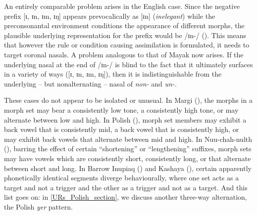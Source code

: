 An entirely comparable problem arises in the English case. Since the negative prefix [ɪ, ɪn, ɪm, ɪŋ] appears prevocalically as [ɪn] (\textit{inelegant})  while the preconsonantal environment conditions the appearance of different morphs, the plausible underlying representation for the prefix would be /ɪn-/ (\citealt{Allen:1978}). This means that however the rule or condition causing assimilation is formulated, it needs to target coronal nasals. A problem analogous to that of Mayak now arises. If the underlying nasal at the end of /ɪn-/ is blind to the fact that it ultimately surfaces in a variety of ways ([ɪ, ɪn, ɪm, ɪŋ]), then it is indistinguishable from the underlying -- but nonalternating -- nasal of \textit{non-} and \textit{un-}.


These cases do not appear to be isolated or unusual. In Margi (\citealt{Hoffmann:1963, Pulleyblank:1986, Archangeli+:2018routledge}), the morphs in a morph set may bear a consistently low tone, a consistently high tone, or may alternate between low and high. In Polish (\citealt{Bethin:1978, Sanders:2003}), morph set members may exhibit a back vowel that is consistently mid, a back vowel that is consistently high, or may exhibit back vowels that alternate between mid and high. In Nuu-chah-nulth (\citealt{Davidson:2002, Stonham:1990, Kim:2003, Archangeli+:2018Henry}), barring the effect of certain ``shortening'' or ``lengthening'' suffixes, morph sets may have vowels which are consistently short, consistently long, or that alternate between short and long. In Barrow Inupiaq (\citealt{Kaplan:1981, Archangeli+:1994}) and Kashaya (\citealt{Buckley:1994}), certain apparently phonetically identical segments diverge behaviourally, where one set acts as a target and not a trigger and the other as a trigger and not as a target. And this list goes on: in \Sec\ref{URs_Polish_section}, we discuss another three-way alternation, the Polish {\it yer} pattern. 

